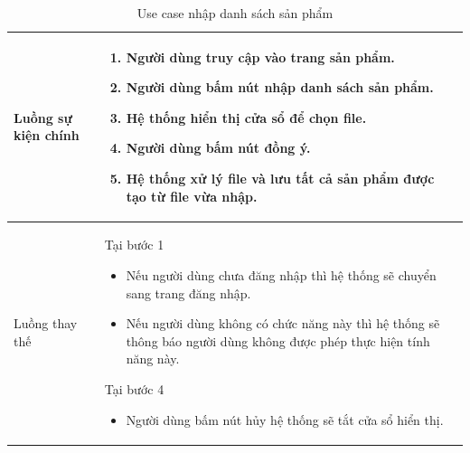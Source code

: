 \documentclass[12pt,a4paper]{article}
\begin{document}
\begin{table}[H]
\begin{tabular}{|p{3.5cm}|p{11.5cm}|c|}
            Luồng sự kiện chính & \vspace{-.8cm}\begin{enumerate}
                                                    \item Người dùng truy cập vào trang sản phẩm.
                                                    \item Người dùng bấm nút nhập danh sách sản phẩm.
                                                    \item Hệ thống hiển thị cửa sổ để chọn file.
                                                    \item Người dùng bấm nút đồng ý.
                                                    \item Hệ thống xử lý file và lưu tất cả sản phẩm được tạo từ file vừa nhập.
            \end{enumerate}
            \\
            \hline
            Luồng thay thế & Tại bước 1\newline
            \vspace{-.8cm}\begin{itemize}
                              \item Nếu người dùng chưa đăng nhập thì hệ thống sẽ chuyển sang trang đăng nhập.
                              \item Nếu người dùng không có chức năng này thì hệ thống sẽ thông báo người dùng không được phép thực hiện tính năng này.
            \end{itemize}
            Tại bước 4\newline
            \vspace{-.8cm}\begin{itemize}
                              \item Người dùng bấm nút hủy hệ thống sẽ tắt cửa sổ hiển thị.
            \end{itemize}
            \\ \hline
        \end{tabular}
        \caption{Use case nhập danh sách sản phẩm}

    \end{table}

\end{document}
